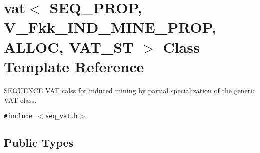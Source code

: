 \section{vat$<$ SEQ\_\-PROP, V\_\-Fkk\_\-IND\_\-MINE\_\-PROP, ALLOC, VAT\_\-ST $>$ Class Template Reference}
\label{classvat_3_01SEQ__PROP_00_01V__Fkk__IND__MINE__PROP_00_01ALLOC_00_01VAT__ST_01_4}
SEQUENCE VAT calss for induced mining by partial specialization of the generic VAT class.  


{\tt \#include $<$seq\_\-vat.h$>$}

\subsection*{Public Types}
